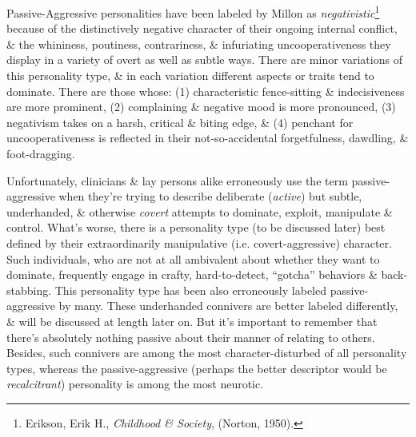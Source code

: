 \documentclass{article}
\numberwithin{equation}{section}
\begin{document}
Passive-Aggressive personalities have been labeled by Millon as \textit{negativistic}\footnote{Erikson, Erik H., \textit{Childhood \& Society}, (Norton, 1950).} because of the distinctively negative character of their ongoing internal conflict, \& the whininess, poutiness, contrariness, \& infuriating uncooperativeness they display in a variety of overt as well as subtle ways. There are minor variations of this personality type, \& in each variation different aspects or traits tend to dominate. There are those whose: (1) characteristic fence-sitting \& indecisiveness are more prominent, (2) complaining \& negative mood is more pronounced, (3) negativism takes on a harsh, critical \& biting edge, \& (4) penchant for uncooperativeness is reflected in their not-so-accidental forgetfulness, dawdling, \& foot-dragging.

Unfortunately, clinicians \& lay persons alike erroneously use the term passive-aggressive when they're trying to describe deliberate (\textit{active}) but subtle, underhanded, \& otherwise \textit{covert} attempts to dominate, exploit, manipulate \& control. What's worse, there is a personality type (to be discussed later) best defined by their extraordinarily manipulative (i.e. covert-aggressive) character. Such individuals, who are not at all ambivalent about whether they want to dominate, frequently engage in crafty, hard-to-detect, ``gotcha'' behaviors \& back-stabbing. This personality type has been also erroneously labeled passive-aggressive by many. These underhanded connivers are better labeled differently, \& will be discussed at length later on. But it's important to remember that there's absolutely nothing passive about their manner of relating to others. Besides, such connivers are among the most character-disturbed of all personality types, whereas the passive-aggressive (perhaps the better descriptor would be \textit{recalcitrant}) personality is among the most neurotic.
\end{document}
